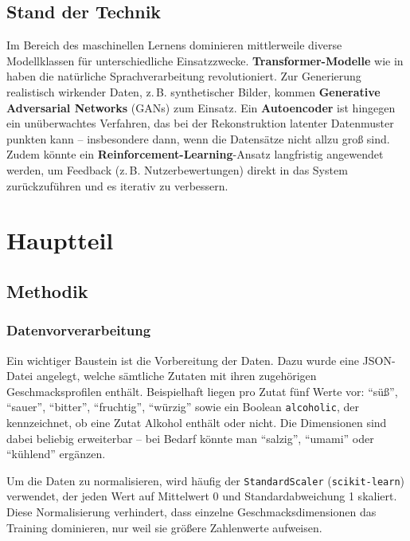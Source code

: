 \documentclass[12pt,a4paper]{report}
\begin{document}
\section{Stand der Technik}
Im Bereich des maschinellen Lernens dominieren mittlerweile diverse Modellklassen für unterschiedliche Einsatzzwecke. \textbf{Transformer-Modelle} wie in \cite{vaswani2017attention} haben die natürliche Sprachverarbeitung revolutioniert. Zur Generierung realistisch wirkender Daten, z.\,B. synthetischer Bilder, kommen \textbf{Generative Adversarial Networks} (GANs) \cite{goodfellow2014generative} zum Einsatz. Ein \textbf{Autoencoder} \cite{goodfellow2016deep} ist hingegen ein unüberwachtes Verfahren, das bei der Rekonstruktion latenter Datenmuster punkten kann – insbesondere dann, wenn die Datensätze nicht allzu groß sind. Zudem könnte ein \textbf{Reinforcement-Learning}-Ansatz \cite{sutton2018reinforcement} langfristig angewendet werden, um Feedback (z.\,B. Nutzerbewertungen) direkt in das System zurückzuführen und es iterativ zu verbessern.

\chapter{Hauptteil}

\section{Methodik}

\subsection{Datenvorverarbeitung}
Ein wichtiger Baustein ist die Vorbereitung der Daten. Dazu wurde eine JSON-Datei angelegt, welche sämtliche Zutaten mit ihren zugehörigen Geschmacksprofilen enthält. Beispielhaft liegen pro Zutat fünf Werte vor: \enquote{süß}, \enquote{sauer}, \enquote{bitter}, \enquote{fruchtig}, \enquote{würzig} sowie ein Boolean \texttt{alcoholic}, der kennzeichnet, ob eine Zutat Alkohol enthält oder nicht. Die Dimensionen sind dabei beliebig erweiterbar – bei Bedarf könnte man \enquote{salzig}, \enquote{umami} oder \enquote{kühlend} ergänzen.

Um die Daten zu normalisieren, wird häufig der \texttt{StandardScaler} (\texttt{scikit-learn}) verwendet, der jeden Wert auf Mittelwert 0 und Standardabweichung 1 skaliert. Diese Normalisierung verhindert, dass einzelne Geschmacksdimensionen das Training dominieren, nur weil sie größere Zahlenwerte aufweisen.
\end{document}

